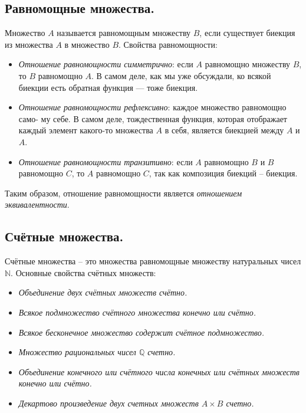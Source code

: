 \subsection{Равномощные множества.}
Множество $A$ называется равномощным множеству $B$, если существует биекция из множества $A$ в множество $B$.
\newline
Свойства равномощности:
\begin{itemize}
    \item \textit{Отношение равномощности симметрично}: если $A$ равномощно множеству $B$, то $B$ равномощно $A$. В самом деле, как мы уже обсуждали, ко всякой биекции есть обратная функция — тоже биекция.
    \item \textit{Отношение равномощности рефлексивно}: каждое множество равномощно само- му себе. В самом деле, тождественная функция, которая отображает каждый элемент какого-то множества $A$ в себя, является биекцией между $A$ и $A$.
    \item \textit{Отношение равномощности транзитивно}: если $A$ равномощно $B$ и $B$ равномощно $C$, то $A$ равномощно $C$, так как композиция биекций -- биекция.
\end{itemize}
Таким образом, отношение равномощности является \textit{отношением эквивалентности}.


\subsection{Счётные множества.}
Счётные множества -- это множества равномощные множеству натуральных чисел $\mathbb{N}$.
\newline
Основные свойства счётных множеств:
\begin{itemize}
    \item \textit{Объединение двух счётных множеств счётно.}
    \item \textit{Всякое подмножество счётного множества конечно или счётно.}
    \item \textit{Всякое бесконечное множество содержит счётное подмножество.}
    \item \textit{Множество рациональных чисел $\mathbb{Q}$ счетно.}
    \item \textit{Объединение конечного или счётного числа конечных или счётных множеств конечно или счётно.}
    \item \textit{Декартово произведение двух счетных множеств $A \times B$ счетно.}
\end{itemize}


